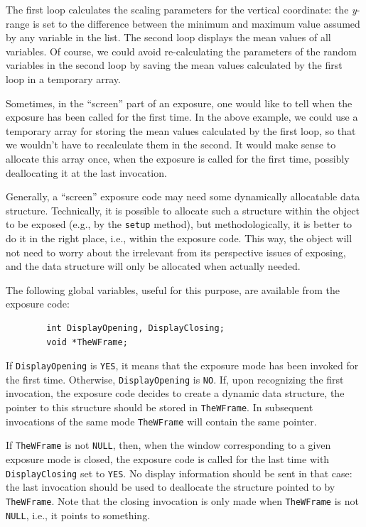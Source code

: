 The first loop calculates the scaling parameters for the vertical
coordinate: the {\em y\/}-range is set to the difference between the minimum and
maximum value assumed by any variable in the list.
The second loop displays the mean values of all variables.
Of course, we could avoid re-calculating the parameters of the random variables
in the second loop
by saving the mean values calculated by the first loop in a temporary
array.

\medskip

\noindent
Sometimes, in the ``screen'' part of an exposure,
one would like to tell when the
exposure has been called for the first time.
In the above example, we could use a temporary array for storing the mean
values calculated by the first loop, so that we wouldn't have to
recalculate them in the second.
It would make sense to allocate this array once, when the exposure is called
for the first time, possibly deallocating it at the last invocation.

Generally, a ``screen'' exposure code
may need some dynamically allocatable data structure.
Technically, it is possible to allocate such a
structure within the object to be exposed (e.g., by the {\tt setup}
method), but methodologically, it is better to do it in the right place, i.e.,
within the exposure code.
This way, the object will not need to worry about the irrelevant from its
perspective issues of exposing, and the data structure will only be allocated
when actually needed.

The following global variables, useful for this purpose,
are available from the exposure code:
\begin{verbatim}
        int DisplayOpening, DisplayClosing;
        void *TheWFrame;
\end{verbatim}

If {\tt DisplayOpening} is {\tt YES}, it means that the exposure mode
has been invoked for the first time.
Otherwise, {\tt DisplayOpening} is {\tt NO}.
If, upon recognizing the first invocation, the exposure code decides to
create a dynamic data structure, the pointer to this structure should be
stored in {\tt TheWFrame}.
In subsequent invocations of the same mode
{\tt TheWFrame} will contain the same pointer.

If {\tt TheWFrame} is not {\tt NULL}, then, when the window corresponding
to a given exposure mode is closed, the exposure code is called for the
last time with {\tt DisplayClosing} set to {\tt YES}.
No display information should be sent in that case: the last invocation
should be used to deallocate the structure pointed to by {\tt TheWFrame}.
Note that the closing invocation is only made when {\tt TheWFrame} is not
{\tt NULL}, i.e., it points to something.

